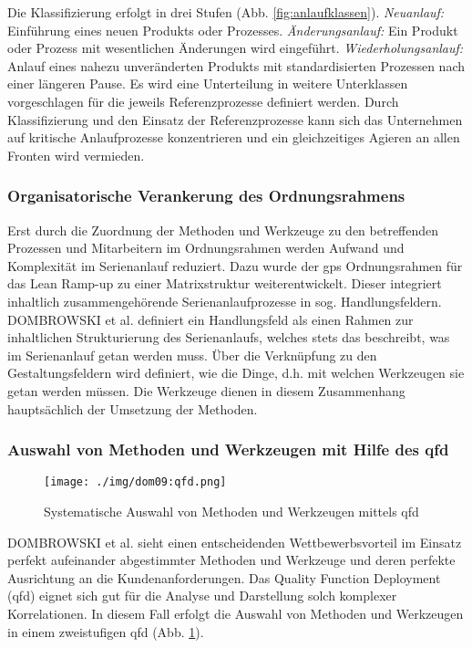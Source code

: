Die Klassifizierung erfolgt in drei Stufen (Abb. \ref{fig:anlaufklassen}). \textit{Neuanlauf:} Einführung eines neuen Produkts oder Prozesses. \textit{Änderungsanlauf:} Ein Produkt oder Prozess mit wesentlichen Änderungen wird eingeführt. \textit{Wiederholungsanlauf:} Anlauf eines nahezu unveränderten Produkts mit standardisierten Prozessen nach einer längeren Pause. 
Es wird eine Unterteilung in weitere Unterklassen vorgeschlagen für die jeweils Referenzprozesse definiert werden. 
Durch Klassifizierung und den Einsatz der Referenzprozesse kann sich das Unternehmen auf kritische Anlaufprozesse konzentrieren und ein gleichzeitiges Agieren an allen Fronten wird vermieden.

\subsubsection{Organisatorische Verankerung des Ordnungsrahmens}
Erst durch die Zuordnung der Methoden und Werkzeuge zu den betreffenden Prozessen und Mitarbeitern im Ordnungsrahmen werden Aufwand und Komplexität im Serienanlauf reduziert. Dazu wurde der \gls{gps} Ordnungsrahmen für das Lean Ramp-up zu einer Matrixstruktur weiterentwickelt. Dieser integriert inhaltlich zusammengehörende Serienanlaufprozesse in sog. Handlungsfeldern. DOMBROWSKI et al. definiert ein Handlungsfeld als einen Rahmen zur inhaltlichen Strukturierung des Serienanlaufs, welches stets das beschreibt, was im Serienanlauf getan werden muss. Über die Verknüpfung zu den Gestaltungsfeldern wird definiert, wie die Dinge, d.h. mit welchen Werkzeugen sie getan werden müssen. Die Werkzeuge dienen in diesem Zusammenhang hauptsächlich der Umsetzung der Methoden. 

\subsubsection{Auswahl von Methoden und Werkzeugen mit Hilfe des \gls{qfd}}

\begin{figure}[ht]
 \centering
 \texttt{[image: ./img/dom09:qfd.png]}
 \caption{Systematische Auswahl von Methoden und Werkzeugen mittels \gls{qfd} \cite{Dombrowski2009}}
 \label{fig:qfd}
\end{figure}

DOMBROWSKI et al. sieht einen entscheidenden Wettbewerbsvorteil im Einsatz perfekt aufeinander abgestimmter Methoden und Werkzeuge und deren perfekte Ausrichtung an die Kundenanforderungen. %
Das Quality Function Deployment (\gls{qfd}) eignet sich gut für die Analyse und Darstellung solch komplexer Korrelationen. In diesem Fall erfolgt die Auswahl von Methoden und Werkzeugen in einem zweistufigen \gls{qfd} (Abb. \ref{fig:qfd}). 

